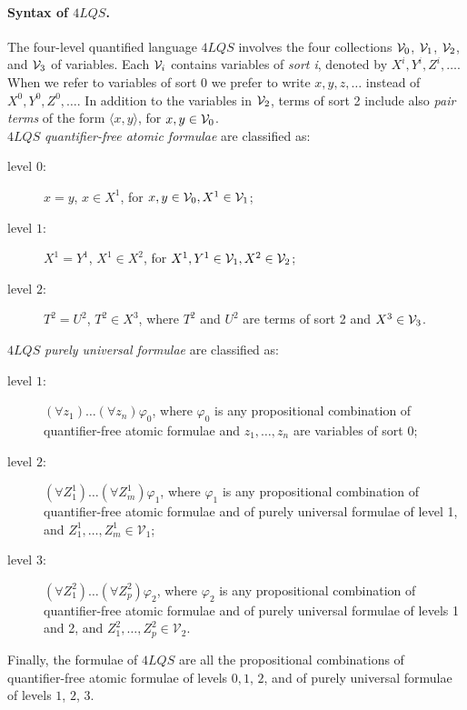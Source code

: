 \documentclass{fundam}
\newcommand{\QLQS}{\ensuremath{\mbox{$4\mathit{LQS}$}}\xspace}
\begin{document}
\paragraph{Syntax of $\QLQS$.}
The four-level quantified language $\QLQS$ involves the four collections
${\cal V}_{0}$, ${\cal V}_{1}$, ${\cal V}_{2}$, and ${\cal V}_{3}$ of variables. Each ${\cal V}_{i}$
contains variables of \emph{sort i}, denoted by $X^{i},Y^{i},Z^{i},\ldots$.
When we refer to variables of sort 0 we prefer to write $x,y,z,\ldots$ instead of $X^{0},Y^{0},Z^{0},\ldots$.
In addition to the variables in ${\cal V}_{2}$, terms of sort 2
include also \emph{pair terms} of the form $\langle x,y\rangle$, for
$x,y \in {\cal V}_{0}$.\\[.2cm]
$\QLQS$ \emph{quantifier-free atomic formulae} are classified as:
\begin{description}
\item[level $0$:] $x = y$, $x \in X^{1}$, for $x,y \in {\cal V}_{0},
X^{1} \in {\cal V}_{1}$;

\item[level $1$:] $X^{1} = Y^{1}$, $X^{1} \in X^{2}$, for $X^{1},Y^{1}
\in {\cal V}_{1}, X^{2} \in {\cal V}_{2}$;

\item[level $2$:] $T^{2} = U^{2}$, $T^{2} \in X^{3}$, where  $T^{2}$
and $U^{2}$ are terms of sort 2 and $X^{3} \in {\cal V}_{3}$.
\end{description}
$\QLQS$ \emph{purely universal formulae} are classified as:
\begin{description}
    \item[level $1$:] $(\forall z_{1}) \ldots (\forall z_{n})
    \varphi_{0}$, where $\varphi_{0}$ is any propositional combination
    of quantifier-free atomic formulae and $z_{1},\ldots,z_{n}$ are
    variables of sort $0$;

    \item[level $2$:] $(\forall Z_{1}^{1}) \ldots (\forall Z_{m}^{1})
    \varphi_{1}$, where $\varphi_{1}$ is any propositional combination
    of quantifier-free atomic formulae and of purely universal
    formulae of level 1, and $Z_{1}^{1},\ldots,Z_{m}^{1} \in
    \mathcal{V}_{1}$;

    \item[level $3$:] $(\forall Z_{1}^{2}) \ldots (\forall Z_{p}^{2})
    \varphi_{2}$, where $\varphi_{2}$ is any propositional combination
    of quantifier-free atomic formulae and of purely universal
    formulae of levels 1 and 2, and $Z_{1}^{2},\ldots,Z_{p}^{2} \in
    \mathcal{V}_{2}$.
\end{description}
Finally, the formulae of $\QLQS$ are all the propositional
combinations of quantifier-free atomic formulae of levels $0,1$, $2$,
and of purely universal formulae of levels $1$, $2$, $3$.
\end{document}
